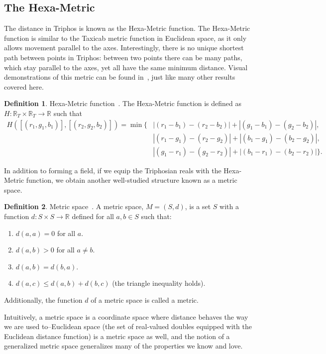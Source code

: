 \documentclass[11pt]{article}
\newcommand{\Tri}{\mathbb{R}_T}
\theoremstyle{definition}
\newtheorem{definition}{Definition}
\theoremstyle{plain}
\theoremstyle{remark}
\begin{document}
	\subsection{The Hexa-Metric}

	The distance in Triphos is known as the Hexa-Metric function. The
	Hexa-Metric function is similar to the Taxicab metric function in Euclidean
	space, as it only allows movement parallel to the axes. Interestingly,
	there is no unique shortest path between points in Triphos: between two
	points there can be many paths, which stay parallel to the axes, yet all
	have the same minimum distance. Visual demonstrations of this metric can be
	found in~\cite{egging}, just like many other results covered here.

	\begin{definition}{Hexa-Metric function~\cite{egging}.} The Hexa-Metric
	function is defined as \(H: \Tri \times \Tri \to \mathbb{R}\) such that
		\begin{align*}
			H([(r_1,g_1,b_1)], [(r_2,g_2,b_2)]) = \min{}\{ &|(r_1 - b_1) - (r_2
			- b_2)| + |(g_1 - b_1) - (g_2 - b_2)|, \\
			&|(r_1 - g_1) - (r_2 - g_2)| + |(b_1 - g_1) - (b_2 - g_2)|, \\
			&|(g_1 - r_1) - (g_2 - r_2)| + |(b_1 - r_1) - (b_2 - r_2)| \}.
		\end{align*}
	\end{definition}

	In addition to forming a field, if we equip the Triphosian reals with the
	Hexa-Metric function, we obtain another well-studied structure known as a
	metric space.

	\begin{definition}{Metric space~\cite{kaplansky}.}
		A metric space, \(M = (S,d)\), is a set \(S\) with a function \(d: S
		\times S \to \mathbb{R}\) defined for all \(a,b \in S\) such that:
		\begin{enumerate}
			\item \(d(a,a) = 0\) for all \(a\).
			\item \(d(a,b) > 0\) for all \(a \neq b\).
			\item \(d(a,b) = d(b,a)\).
			\item \(d(a,c) \leq d(a,b) + d(b,c)\) (the triangle inequality
			holds).
		\end{enumerate}
		Additionally, the function \(d\) of a metric space is called a metric.
	\end{definition}

	Intuitively, a metric space is a coordinate space where distance behaves
	the way we are used to--Euclidean space (the set of real-valued doubles
	equipped with the Euclidean distance function) is a metric space as well,
	and the notion of a generalized metric space generalizes many of the
	properties we know and love.
\end{document}
